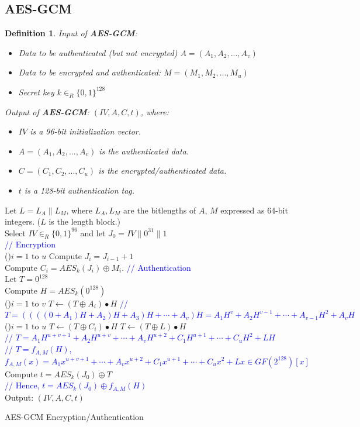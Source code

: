 \documentclass[12pt,titlepage]{article}
\newtheorem{protodefinition}[prototheorem]{Definition}
\newenvironment{definition}
{\colorlet{shadecolor}{cyan!15}\begin{shaded}\begin{protodefinition}\normalfont}{\end{protodefinition}\end{shaded}}
\begin{document}
\subsection{AES-GCM}
\begin{definition}
	Input of \textbf{AES-GCM}: \begin{itemize}
		\item Data to be authenticated (but not encrypted) $A = (A_1, A_2, ..., A_v)$
		\item Data to be encrypted and authenticated: $M = (M_1, M_2, ..., M_u)$
		\item Secret key $k \in_R \{0,1\}^{128}$
	\end{itemize}
	Output of \textbf{AES-GCM}: $(IV, A, C, t)$, where: \begin{itemize}
		\item $IV$ is a 96-bit initialization vector.
		\item $A = (A_1, A_2, ..., A_v)$ is the authenticated data.
		\item $C = (C_1 , C_2 , ..., C_u )$ is the encrypted/authenticated data.
		\item $t$ is a 128-bit authentication tag.
	\end{itemize}
\end{definition}

\begin{algorithm}
	Let $L = L_A \| L_M $, where $L_A, L_M$ are the bitlengths of $A$, $M$ expressed as 64-bit integers. ($L$ is the length block.)\\
	Select $IV \in_R \{0,1\}^{96}$ and let $J_0 = IV \| 0^{31} \| 1$\\
	\textcolor{blue}{// Encryption}\\
	\For(){$i = 1$ to $u$}{
		Compute $J_i = J_{i-1} + 1$\\
		Compute $C_i = AES_k (J_i) \oplus M_i$.
	}
	\textcolor{blue}{// Authentication}\\
	Let $T = 0^{128}$\\
	Compute $H = AES_k (0^{128})$\\
	\For(){$i = 1$ to $v$}{
		$T \leftarrow (T \oplus A_i) \bullet H$
	}
	\textcolor{blue}{// $T = ((((0 + A_1)H + A_2)H + A_3)H + \cdots + A_v)H = A_1H^v + A_2H^{v-1} + \cdots + A_{v-1}H^2 + A_vH$}\\
	\For(){$i = 1$ to $u$}{
		$T \leftarrow (T \oplus C_i) \bullet H$
	}
	$T \leftarrow (T \oplus L) \bullet H$\\
	\textcolor{blue}{// $T = A_1H^{u+v+1} + A_2H^{u+v} + \cdots + A_vH^{u+2} + C_1H^{u+1} + \cdots + C_uH^2 + LH$}\\
	\textcolor{blue}{// $T = f_{A, M}(H)$, $f_{A, M}(x) = A_1x^{u+v+1} + \cdots + A_vx^{u+2} + C_1x^{u+1} + \cdots + C_ux^2+Lx \in GF(2^{128})[x]$}\\
	Compute $t = AES_k (J_0) \oplus T$\\
	\textcolor{blue}{// Hence, $t = AES_k(J_0) \oplus f_{A, M}(H)$}\\
	Output: $(IV, A, C, t)$
	\caption{AES-GCM Encryption/Authentication}
\end{algorithm}
\end{document}
